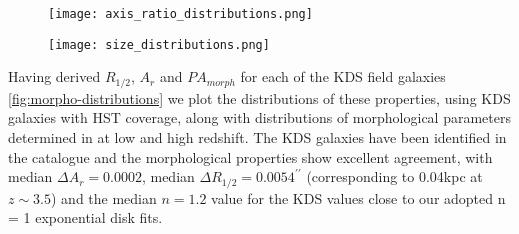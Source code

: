 \documentclass[fleqn,usenatbib]{mn2e}
\begin{document}
\begin{figure*}
    \centering \hspace{-2.0cm}
    \begin{subfigure}[h!]{0.50\textwidth}
        \centering
        \texttt{[image: axis\_ratio\_distributions.png]}
    \end{subfigure} \hspace{0.4cm}
    \begin{subfigure}[h!]{0.50\textwidth}
        \centering
        \texttt{[image: size\_distributions.png]}
    \end{subfigure}
    \caption{We crossmatch publicly available spectroscopic redshifts for SFGs, as discussed in the text, with the morphological catalogue presented in \protect\cite{VanderWel2012} in two different redshift slices.
    This provides a set of reference morphological properties for typical SFGs at different evolutionary stages to which the derived KDS values can be compared.
    We find that the KDS galaxies are much more compact than those at low redshift, as traced by $R_{1/2}$ parameter, which could partially be explained by the F160W filter tracing a younger stellar population at $z\sim3.5$.
    The distribution of KDS $R_{1/2}$ values are consistent with those in the higher redshift reference sample.
    The $A_{r}$ distribution appears to be constant with time as traced by the reference samples, and the KDS values are in good agreement with a relatively uniform distribution spanning $0.3 < A_{r} < 0.9$.
    This shows that we have not been biased towards deriving low or high $A_{r}$ values.}
    \label{fig:morpho-distributions}
\end{figure*}

Having derived $R_{1/2}$, $A_{r}$ and $PA_{morph}$ for each of the KDS field galaxies \ref{fig:morpho-distributions} we plot the distributions of these properties, using KDS galaxies with HST coverage, along with distributions of morphological parameters determined in \cite{VanderWel2012} at low and high redshift.
The KDS galaxies have been identified in the \cite{VanderWel2012} catalogue and the morphological properties show excellent agreement, with median $\Delta A_{r} = 0.0002$, median $\Delta R_{1/2} = 0.0054^{\prime\prime}$ (corresponding to 0.04kpc at $z\sim3.5$) and the median \cite{VanderWel2012} $n = 1.2$ value for the KDS values close to our adopted n = 1 exponential disk fits.
\end{document}
